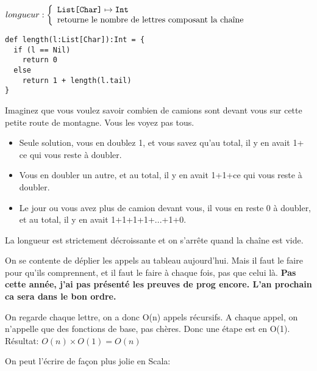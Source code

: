 \documentclass[10pt]{article}\usepackage[correction,nu]{esial}
\begin{document}
\newcommand{\Type}[1]{\text{\texttt{#1}}}
\begin{Question}
  $longueur: \left\{
    \begin{array}{l}
      \Type{List[Char]}\mapsto \Type{Int}\\
      \text{retourne le nombre de lettres composant la chaîne}
    \end{array}\right.$
\end{Question}
\begin{Reponse}
  \begin{Verbatim}[label=longueur(ch)]
def length(l:List[Char]):Int = {
  if (l == Nil)
    return 0
  else 
    return 1 + length(l.tail)
}
  \end{Verbatim}
  \begin{description}
    \item
    \item[Idée pour trouver comment faire] Imaginez que vous voulez savoir
      combien de camions sont devant vous sur cette petite route de
      montagne. Vous les voyez pas tous.
      \begin{itemize}
      \item Seule solution, vous en doublez 1, et vous savez qu'au total, il y
        en avait 1+ ce qui vous reste à doubler.
      \item  Vous en doubler un autre, et au total, il y en avait 1+1+ce qui
        vous reste à doubler.
      \item Le jour ou vous avez plus de camion devant vous, il vous en reste 0
        à doubler, et au total, il y en avait 1+1+1+1+...+1+0.
      \end{itemize}
  \item[Terminaison:] La longueur est strictement décroissante et on s'arrête
    quand la chaîne est vide.
  \item[Correction:] On se contente de déplier les appels au tableau
    aujourd'hui. Mais il faut le faire pour qu'ils comprennent, et il faut le
    faire à chaque fois, pas que celui là. \textbf{Pas cette année, j'ai pas
      présenté les preuves de prog encore. L'an prochain ca sera dans le bon
      ordre.} 
  \item[Complexité:] On regarde chaque lettre, on a donc O(n) appels
    récursifs. A chaque appel, on n'appelle que des fonctions de base, pas
    chères. Donc une étape est en O(1). Résultat: $O(n)\times O(1)=O(n)$
  \end{description}
On peut l'écrire de façon plus jolie en Scala:


\end{Reponse}
\end{document}
